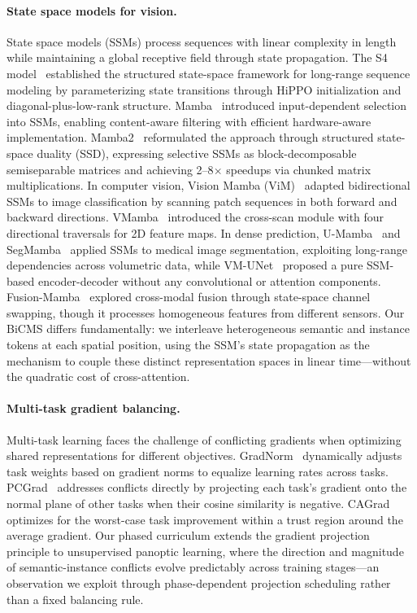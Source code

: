 \documentclass[10pt,twocolumn,letterpaper]{article}
\begin{document}
\paragraph{State space models for vision.}
State space models (SSMs) process sequences with linear complexity in length while maintaining a global receptive field through state propagation. The S4 model~\cite{gu2022s4} established the structured state-space framework for long-range sequence modeling by parameterizing state transitions through HiPPO initialization and diagonal-plus-low-rank structure. Mamba~\cite{gu2023mamba} introduced input-dependent selection into SSMs, enabling content-aware filtering with efficient hardware-aware implementation. Mamba2~\cite{dao2024mamba2} reformulated the approach through structured state-space duality (SSD), expressing selective SSMs as block-decomposable semiseparable matrices and achieving 2--8$\times$ speedups via chunked matrix multiplications. In computer vision, Vision Mamba (ViM)~\cite{zhu2024vim} adapted bidirectional SSMs to image classification by scanning patch sequences in both forward and backward directions. VMamba~\cite{liu2024vmamba} introduced the cross-scan module with four directional traversals for 2D feature maps. In dense prediction, U-Mamba~\cite{ma2024umamba} and SegMamba~\cite{xing2024segmamba} applied SSMs to medical image segmentation, exploiting long-range dependencies across volumetric data, while VM-UNet~\cite{ruan2024vmunet} proposed a pure SSM-based encoder-decoder without any convolutional or attention components. Fusion-Mamba~\cite{dong2024fusionmamba} explored cross-modal fusion through state-space channel swapping, though it processes homogeneous features from different sensors. Our BiCMS differs fundamentally: we interleave heterogeneous semantic and instance tokens at each spatial position, using the SSM's state propagation as the mechanism to couple these distinct representation spaces in linear time---without the quadratic cost of cross-attention.

\paragraph{Multi-task gradient balancing.}
Multi-task learning faces the challenge of conflicting gradients when optimizing shared representations for different objectives. GradNorm~\cite{chen2018gradnorm} dynamically adjusts task weights based on gradient norms to equalize learning rates across tasks. PCGrad~\cite{yu2020pcgrad} addresses conflicts directly by projecting each task's gradient onto the normal plane of other tasks when their cosine similarity is negative. CAGrad~\cite{liu2021cagrad} optimizes for the worst-case task improvement within a trust region around the average gradient. Our phased curriculum extends the gradient projection principle to unsupervised panoptic learning, where the direction and magnitude of semantic-instance conflicts evolve predictably across training stages---an observation we exploit through phase-dependent projection scheduling rather than a fixed balancing rule.
\end{document}

